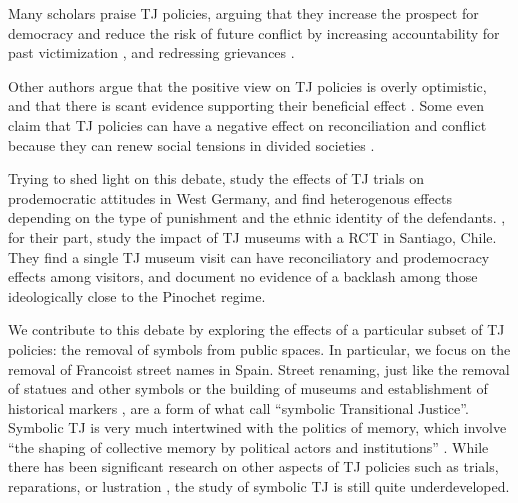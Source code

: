 \documentclass[12pt, notitlepage]{article}
\let\footnote=\endnote
\begin{document}
Many scholars praise TJ policies, arguing that they increase the prospect for democracy \citep{Elster:2004aa, Sikkink:2007aa} and reduce the risk of future conflict by increasing accountability for past victimization \citep{Kim:2010aa, Meernik:2010aa}, and redressing grievances \citep{Akhavan:1998aa,  Loyle:2017aa}.

Other authors argue that the positive view on TJ policies is overly optimistic, and that there is scant evidence supporting their beneficial effect \citep{Mendeloff:2004aa, Thoms:2010aa}. Some even claim that TJ policies can have a negative effect on reconciliation and conflict because they can renew social tensions in divided societies \citep{Snyder:2004aa}.

Trying to shed light on this debate, \cite{Capoccia:2020aa} study the effects of TJ trials on prodemocratic attitudes in West Germany, and find heterogenous effects depending on the type of punishment and the ethnic identity of the defendants. \cite{Balcells:2020aa}, for their part, study the impact of TJ museums with a RCT in Santiago, Chile. They find a single TJ museum visit can have reconciliatory and prodemocracy effects among visitors, and document no evidence of a backlash among those ideologically close to the Pinochet regime.

We contribute to this debate by exploring the effects of a particular subset of TJ policies: the removal of symbols from public spaces. In particular, we focus on the removal of Francoist street names in Spain. Street renaming, just like the removal of statues and other symbols or the building of museums and establishment of historical markers \citep{Ward2021}, are a form of what \citet{Aguilar:2011aa} call ``symbolic Transitional Justice''. Symbolic TJ is very much intertwined with the politics of memory, which involve ``the shaping of collective memory by political actors and institutions'' \citep[][176]{Zubrzycki:2020aa}. While there has been significant research on other aspects of TJ policies such as trials, reparations, or lustration \citep{Nalepa:2010, Loyle:2017aa, voytas:2021}, the study of symbolic TJ is still quite underdeveloped.
\end{document}
